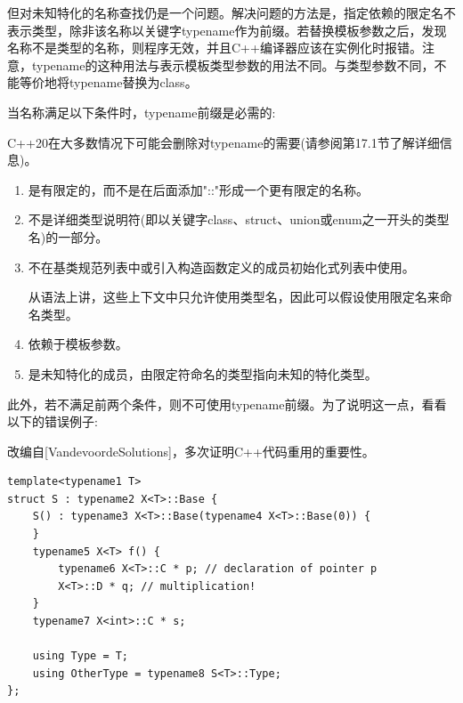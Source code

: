 但对未知特化的名称查找仍是一个问题。解决问题的方法是，指定依赖的限定名不表示类型，除非该名称以关键字typename作为前缀。若替换模板参数之后，发现名称不是类型的名称，则程序无效，并且C++编译器应该在实例化时报错。注意，typename的这种用法与表示模板类型参数的用法不同。与类型参数不同，不能等价地将typename替换为class。

当名称满足以下条件时，typename前缀是必需的:

\begin{tcolorbox}[colback=webgreen!5!white,colframe=webgreen!75!black]
\hspace*{0.75cm}C++20在大多数情况下可能会删除对typename的需要(请参阅第17.1节了解详细信息)。
\end{tcolorbox}

\begin{enumerate}
\item 
是有限定的，而不是在后面添加"::"形成一个更有限定的名称。

\item 
不是详细类型说明符(即以关键字class、struct、union或enum之一开头的类型名)的一部分。

\item 
不在基类规范列表中或引入构造函数定义的成员初始化式列表中使用。

\begin{tcolorbox}[colback=webgreen!5!white,colframe=webgreen!75!black]
从语法上讲，这些上下文中只允许使用类型名，因此可以假设使用限定名来命名类型。
\end{tcolorbox}

\item 
依赖于模板参数。

\item 
是未知特化的成员，由限定符命名的类型指向未知的特化类型。
\end{enumerate}

此外，若不满足前两个条件，则不可使用typename前缀。为了说明这一点，看看以下的错误例子:

\begin{tcolorbox}[colback=webgreen!5!white,colframe=webgreen!75!black]
\hspace*{0.75cm}改编自[VandevoordeSolutions]，多次证明C++代码重用的重要性。
\end{tcolorbox}

\begin{lstlisting}[style=styleCXX]
template<typename1 T>
struct S : typename2 X<T>::Base {
	S() : typename3 X<T>::Base(typename4 X<T>::Base(0)) {
	}
	typename5 X<T> f() {
		typename6 X<T>::C * p; // declaration of pointer p
		X<T>::D * q; // multiplication!
	}
	typename7 X<int>::C * s;
	
	using Type = T;
	using OtherType = typename8 S<T>::Type;
};
\end{lstlisting}

